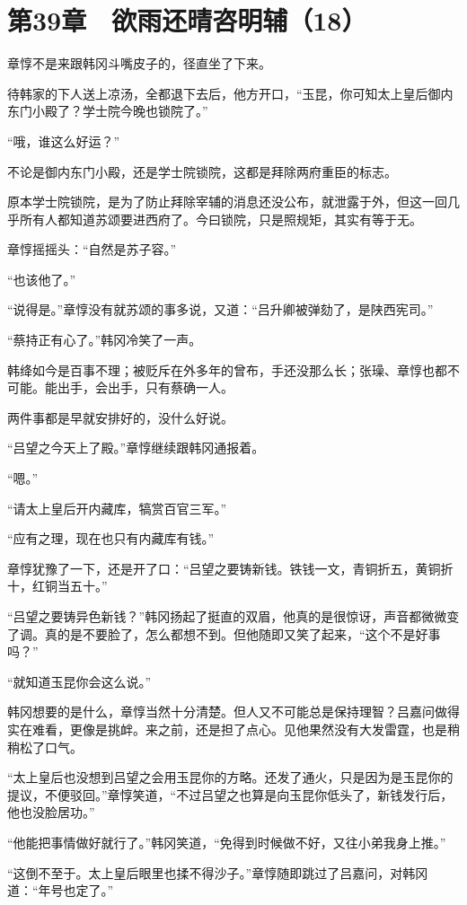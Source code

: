 \section{第39章　欲雨还晴咨明辅（18）}

章惇不是来跟韩冈斗嘴皮子的，径直坐了下来。

待韩家的下人送上凉汤，全都退下去后，他方开口，“玉昆，你可知太上皇后御内东门小殿了？学士院今晚也锁院了。”

“哦，谁这么好运？”

不论是御内东门小殿，还是学士院锁院，这都是拜除两府重臣的标志。

原本学士院锁院，是为了防止拜除宰辅的消息还没公布，就泄露于外，但这一回几乎所有人都知道苏颂要进西府了。今曰锁院，只是照规矩，其实有等于无。

章惇摇摇头：“自然是苏子容。”

“也该他了。”

“说得是。”章惇没有就苏颂的事多说，又道：“吕升卿被弹劾了，是陕西宪司。”

“蔡持正有心了。”韩冈冷笑了一声。

韩绛如今是百事不理；被贬斥在外多年的曾布，手还没那么长；张璪、章惇也都不可能。能出手，会出手，只有蔡确一人。

两件事都是早就安排好的，没什么好说。

“吕望之今天上了殿。”章惇继续跟韩冈通报着。

“嗯。”

“请太上皇后开内藏库，犒赏百官三军。”

“应有之理，现在也只有内藏库有钱。”

章惇犹豫了一下，还是开了口：“吕望之要铸新钱。铁钱一文，青铜折五，黄铜折十，红铜当五十。”

“吕望之要铸异色新钱？”韩冈扬起了挺直的双眉，他真的是很惊讶，声音都微微变了调。真的是不要脸了，怎么都想不到。但他随即又笑了起来，“这个不是好事吗？”

“就知道玉昆你会这么说。”

韩冈想要的是什么，章惇当然十分清楚。但人又不可能总是保持理智？吕嘉问做得实在难看，更像是挑衅。来之前，还是担了点心。见他果然没有大发雷霆，也是稍稍松了口气。

“太上皇后也没想到吕望之会用玉昆你的方略。还发了通火，只是因为是玉昆你的提议，不便驳回。”章惇笑道，“不过吕望之也算是向玉昆你低头了，新钱发行后，他也没脸居功。”

“他能把事情做好就行了。”韩冈笑道，“免得到时候做不好，又往小弟我身上推。”

“这倒不至于。太上皇后眼里也揉不得沙子。”章惇随即跳过了吕嘉问，对韩冈道：“年号也定了。”


